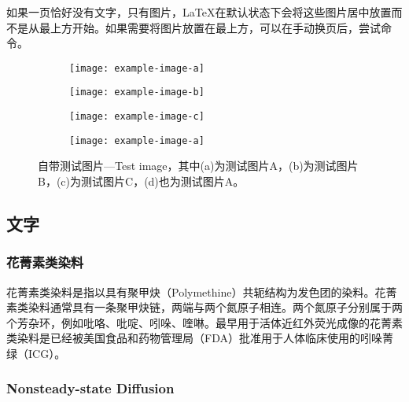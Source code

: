 如果一页恰好没有文字，只有图片，\LaTeX 在默认状态下会将这些图片居中放置而不是从最上方开始。如果需要将图片放置在最上方，可以在\verbbox{\clearpage}手动换页后，尝试\verbbox{\begin{figure}[!ht]}命令。

\clearpage

\begin{figure}[!ht]
    \centering
    \begin{subfigure}[t]{.45\linewidth}
        \centering
        \caption{}\label{F:test-c-sub-a}
        \texttt{[image: example-image-a]}
    \end{subfigure}
    \hfill %
    \begin{subfigure}[t]{.45\linewidth}
        \centering
        \caption{}\label{F:test-c-sub-b}
        \texttt{[image: example-image-b]}
    \end{subfigure} %
    \begin{subfigure}[t]{.45\linewidth}
        \centering
        \caption{}\label{F:test-c-sub-c}
        \texttt{[image: example-image-c]}
    \end{subfigure}
    \hfill
    \begin{subfigure}[t]{.45\linewidth}
        \centering
        \caption{}\label{F:test-c-sub-d}
        \texttt{[image: example-image-a]}
    \end{subfigure}
    \caption{自带测试图片---Test image，其中(a)为测试图片A，(b)为测试图片B，(c)为测试图片C，(d)也为测试图片A。}\label{F:test-c}
\end{figure}

\subsection{文字}

\subsubsection{花菁素类染料}

花菁素类染料是指以具有聚甲炔（Polymethine）共轭结构为发色团的染料。花菁素类染料通常具有一条聚甲炔链，两端与两个氮原子相连。两个氮原子分别属于两个芳杂环，例如吡咯、吡啶、吲哚、喹啉。最早用于活体近红外荧光成像的花菁素类染料是已经被美国食品和药物管理局（FDA）批准用于人体临床使用的吲哚菁绿（ICG）。

\subsubsection{Nonsteady-state Diffusion}

